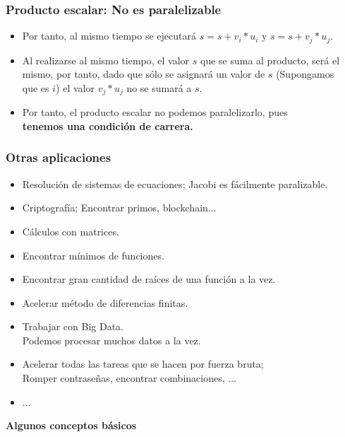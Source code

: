 \documentclass[aspectratio=169]{beamer}
\begin{document}
\begin{frame}[fragile]
	\frametitle{Producto escalar: No es paralelizable}
	
	\begin{itemize}
		\item Por tanto, al mismo tiempo se ejecutará $s = s + v_i * u_i$ y $s = s + v_j * u_j$.
		\pause
		\item Al realizarse al mismo tiempo, el valor $s$ que se suma al producto, será el mismo, por tanto, dado que sólo se asignará un valor de $s$ (Supongamos\\ que es $i$) el valor $v_j * u_j$ no se sumará a $s$.
		\pause
		\item Por tanto, el producto escalar no podemos paralelizarlo, pues \\\textbf{tenemos una condición de carrera.}
	\end{itemize}
\end{frame}

\begin{frame}[fragile]
	\frametitle{Otras aplicaciones}
	
	\begin{itemize}
		\item Resolución de sistemas de ecuaciones; Jacobi es fácilmente paralizable.
		\pause
		\item Criptografía; Encontrar primos, blockchain...
		\pause
		\item Cálculos con matrices.
		\pause
		\item Encontrar mínimos de funciones.
		\pause
		\item Encontrar gran cantidad de raíces de una función a la vez.
		\pause
		\item Acelerar método de diferencias finitas.
		\pause
		\item Trabajar con Big Data.\pause\\ Podemos procesar muchos datos a la vez.
		\pause
		\item Acelerar todas las tareas que se hacen por fuerza bruta;\\Romper contraseñas, encontrar combinaciones, ...
		\pause
		\item ...
	\end{itemize}
\end{frame}

\begin{frame}
	\centering \LARGE \bfseries \color{naranjaUCA} Algunos conceptos básicos
\end{frame}
\end{document}
